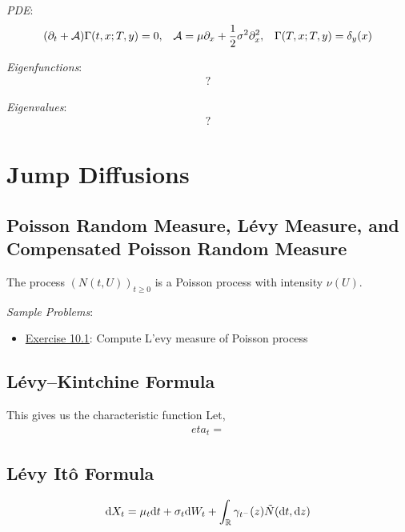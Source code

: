 \documentclass[12pt]{article}
\begin{document}
\textit{PDE}:
\begin{align*}
    (\partial_t + \mathcal{A}) \Gamma(t,x;T,y) = 0,&& \mathcal{A} = \mu \partial_x + \frac{1}{2}\sigma^2 \partial_x^2 ,&& \Gamma(T,x;T,y) = \delta_y(x)
\end{align*}

\textit{Eigenfunctions}:
\begin{align*}
    ?
\end{align*}

\textit{Eigenvalues}:
\begin{align*}
    ?
\end{align*}




\pagebreak
\section{Jump Diffusions}

\subsection{Poisson Random Measure, L\'evy Measure, and Compensated Poisson Random Measure}

The process \( (N(t,U))_{t\geq 0} \) is a Poisson process with intensity \( \nu(U) \).

\textit{Sample Problems}:
\begin{itemize}[nolistsep]
    \item \hyperref[Exercise 10.1]{Exercise 10.1}: Compute L'evy measure of Poisson process
\end{itemize}



\subsection{L\'evy--Kintchine Formula}
This gives us the characteristic function 
Let,
\begin{align*}
    eta_t = 
\end{align*}

\subsection{L\'evy It\^o Formula}
\begin{align*}
    \mathrm{d} X_t = \mu_t \mathrm{d} t + \sigma_t\mathrm{d} W_t + \int_{\mathbb{R}} \gamma_{t^-}(z) \tilde{N}(\mathrm{d} t,\mathrm{d} z) 
\end{align*}
\end{document}
